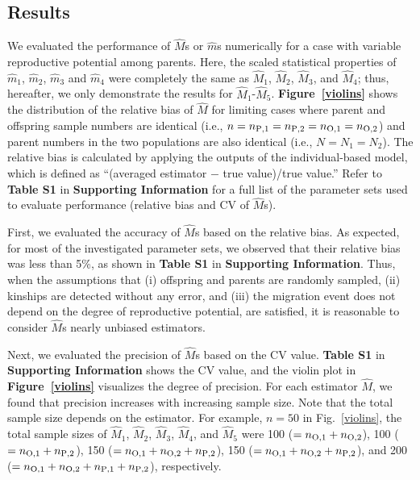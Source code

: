 \documentclass[12pt, English]{article}
\begin{document}
\begin{spacing}{1.9}
\section{Results}\label{sec3}

We evaluated the performance of ${\hat M}$s or ${\hat m}$s numerically for a case with variable reproductive potential among parents. Here, the scaled statistical properties of ${\hat m_1}$,  ${\hat m_2}$,  ${\hat m_3}$ and ${\hat m_4}$ were completely the same as ${\hat M_1}$, ${\hat M_2}$, ${\hat M_3}$, and ${\hat M_4}$; thus, hereafter, we only demonstrate the results for ${\hat M_1}$-${\hat M_5}$. {\bf Figure~\ref{violins}} shows the distribution of the relative bias of ${\hat M}$ for limiting cases where parent and offspring sample numbers are identical (i.e., $n=n_{\rm P,1}=n_{\rm P,2}=n_{\rm O,1}= n_{\rm O,2}$) and parent numbers in the two populations are also identical (i.e., $N=N_1=N_2$). The relative bias is calculated by applying the outputs of the individual-based model, which is defined as ``(averaged estimator $-$ true value)/true value.'' Refer to {\bf Table S1} in {\bf Supporting Information} for a full list of the parameter sets used to evaluate performance (relative bias and CV of ${\hat M}$s). 
 
\begin{center}
\end{center}

First, we evaluated the accuracy of ${\hat M}$s based on the relative bias. As expected, for most of the investigated parameter sets, we observed that their relative bias was less than 5\%, as shown in {\bf Table S1} in {\bf Supporting Information}. Thus, when the assumptions that (i) offspring and parents are randomly sampled, (ii) kinships are detected without any error, and (iii) the migration event does not depend on the degree of reproductive potential, are satisfied, it is reasonable to consider ${\hat M}$s nearly unbiased estimators. 

Next, we evaluated the precision of ${\hat M}$s based on the CV value. {\bf Table S1} in {\bf Supporting Information} shows the CV value, and the violin plot in {\bf Figure~\ref{violins}} visualizes the degree of precision. For each estimator ${\hat M}$, we found that precision increases with increasing sample size. Note that the total sample size depends on the estimator. For example, $n=50$ in Fig.~\ref{violins}, the total sample sizes of ${\hat M_1}$, ${\hat M_2}$, ${\hat M_3}$, ${\hat M_4}$, and ${\hat M_5}$ were 100 ($=n_{\rm O,1}+n_{\rm O,2}$), 100 ($=n_{\rm O,1}+n_{\rm P,2}$), 150 ($=n_{\rm O,1}+n_{\rm O,2}+n_{\rm P,2}$), 150 ($=n_{\rm O,1}+n_{\rm O,2}+n_{\rm P,2}$), and 200 ($=n_{\rm O,1}+n_{\rm O,2}+n_{\rm P,1}+n_{\rm P,2}$), respectively. 


\end{spacing}
\end{document}
